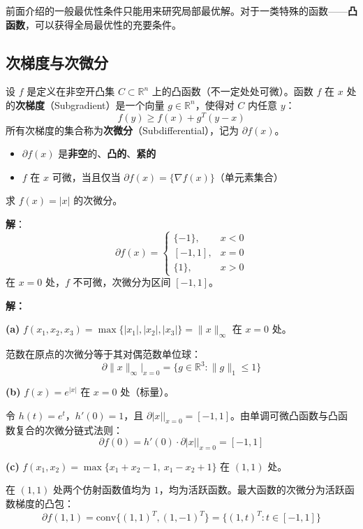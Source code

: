 前面介绍的一般最优性条件只能用来研究局部最优解。对于一类特殊的函数——\textbf{凸函数}，可以获得全局最优性的充要条件。

\subsection{次梯度与次微分}

\begin{definition}[次梯度]
设 $f$ 是定义在非空开凸集 $C \subset \mathbb{R}^n$ 上的凸函数（不一定处处可微）。函数 $f$ 在 $x$ 处的\textbf{次梯度}（Subgradient）是一个向量 $g \in \mathbb{R}^n$，使得对 $C$ 内任意 $y$：
\[
f(y) \geq f(x) + g^T(y - x)
\]
所有次梯度的集合称为\textbf{次微分}（Subdifferential），记为 $\partial f(x)$。
\end{definition}

\begin{property}[次微分的性质]
\begin{itemize}[itemsep=0.3em]
    \item $\partial f(x)$ 是\textbf{非空}的、\textbf{凸的}、\textbf{紧的}
    \item $f$ 在 $x$ 可微，当且仅当 $\partial f(x) = \{\nabla f(x)\}$（单元素集合）
\end{itemize}
\end{property}

\begin{example}[次梯度计算]
求 $f(x) = |x|$ 的次微分。

\textbf{解}：
\[
\partial f(x) = \begin{cases}
\{-1\}, & x < 0 \\[4pt]
[-1, 1], & x = 0 \\[4pt]
\{1\}, & x > 0
\end{cases}
\]
在 $x = 0$ 处，$f$ 不可微，次微分为区间 $[-1, 1]$。
\end{example}

\begin{example}[更多次微分计算]\label{ex:subdiff-more}
\textbf{解：}

\textbf{(a)} $f(x_1, x_2, x_3) = \max\{|x_1|, |x_2|, |x_3|\} = \|x\|_\infty$ 在 $x = 0$ 处。

范数在原点的次微分等于其对偶范数单位球：
\[
\partial \|x\|_\infty \big|_{x=0} = \{g \in \mathbb{R}^3 : \|g\|_1 \leq 1\}
\]

\textbf{(b)} $f(x) = e^{|x|}$ 在 $x = 0$ 处（标量）。

令 $h(t) = e^t$，$h'(0) = 1$，且 $\partial |x|\big|_{x=0} = [-1, 1]$。由单调可微凸函数与凸函数复合的次微分链式法则：
\[
\partial f(0) = h'(0) \cdot \partial |x|\big|_{x=0} = [-1, 1]
\]

\textbf{(c)} $f(x_1, x_2) = \max\{x_1 + x_2 - 1,\ x_1 - x_2 + 1\}$ 在 $(1, 1)$ 处。

在 $(1, 1)$ 处两个仿射函数值均为 $1$，均为活跃函数。最大函数的次微分为活跃函数梯度的凸包：
\[
\partial f(1, 1) = \text{conv}\{(1, 1)^T, (1, -1)^T\} = \{(1, t)^T : t \in [-1, 1]\}
\]
\end{example}

